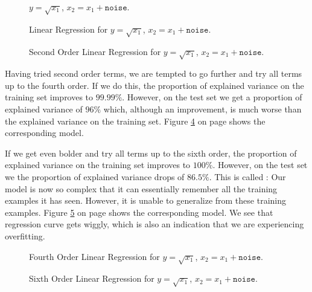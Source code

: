 \begin{figure}[!th]
\caption{$y = \sqrt{x_1}$, $x_2 = x_1 + \mathtt{noise}$.}
\label{fig:sqrt.pdf}
\end{figure}


\begin{figure}[!th]
\caption{Linear Regression for $y = \sqrt{x_1}$, $x_2 = x_1 + \mathtt{noise}$.}
\label{fig:sqrt-linear.pdf}
\end{figure}

\begin{figure}[!th]
\caption{Second Order Linear Regression for $y = \sqrt{x_1}$, $x_2 = x_1 + \mathtt{noise}$.}
\label{fig:sqrt-quadratic.pdf}
\end{figure}

Having tried second order terms, we are tempted to go further and try all terms up to the fourth order.
If we do this, the proportion of explained variance on the training set improves to $99.99\%$.  However, on the
test set we get a proportion of explained variance of $96\%$ which, although an improvement, 
is much worse than the explained variance on the training set.
Figure \ref{fig:sqrt-4.pdf} on page \pageref{fig:sqrt-4.pdf} shows the corresponding model.

If we get even bolder and try all terms up to the sixth order, 
the proportion of explained variance on the training set improves to $100\%$.  However, on the
test set we the proportion of explained variance drops of $86.5\%$.  This is called :
Our model is now so complex that it can essentially remember all the training examples it has seen.  However,
it is unable to generalize from these training examples.  Figure \ref{fig:sqrt-6.pdf} on page
\pageref{fig:sqrt-6.pdf} shows the corresponding model.  We see that regression curve gets wiggly, which is
also an indication that we are experiencing overfitting.

\begin{figure}[!th]
\caption{Fourth Order Linear Regression for $y = \sqrt{x_1}$, $x_2 = x_1 + \mathtt{noise}$.}
\label{fig:sqrt-4.pdf}
\end{figure}

\begin{figure}[!th]
\caption{Sixth Order Linear Regression for $y = \sqrt{x_1}$, $x_2 = x_1 + \mathtt{noise}$.}
\label{fig:sqrt-6.pdf}
\end{figure}

